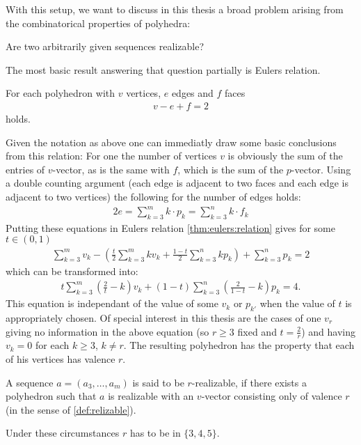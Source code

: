 With this setup, we want to discuss in this thesis a broad problem arising from the combinatorical properties of polyhedra:
\begin{problem} Are two arbitrarily given sequences realizable?
\end{problem}
The most basic result answering that question partially is Eulers relation.
\begin{theorem}\label{thm:eulers:relation}
  For each polyhedron with $v$ vertices, $e$ edges and $f$ faces
  \begin{align*}
    v - e + f = 2
  \end{align*}
  holds.
\end{theorem}
Given the notation as above one can immediatly draw some basic conclusions from this relation: For one the number of vertices $v$ is obviously the sum of the entries of $v$-vector, as is the same with $f$, which is the sum of the $p$-vector. Using a double counting argument (each edge is adjacent to two faces and each edge is adjacent to two vertices) the following for the number of edges holds:
\begin{align*}
  2e = \sum_{k=3}^{m} k \cdot p_k = \sum_{k=3}^{n} k \cdot f_k
\end{align*}
Putting these equations in Eulers relation \autoref{thm:eulers:relation} gives for some $t \in (0, 1)$
\begin{align*}
  \sum_{k=3}^m v_k - \left(\frac{t}{2} \sum_{k=3}^m k v_k + \frac{1-t}{2} \sum_{k=3}^n k p_k \right) + \sum_{k=3}^n p_k = 2
\end{align*}
which can be transformed into:
\begin{align*}
  t \sum_{k=3}^m \left(\frac{2}{t} - k \right) v_k + (1-t) \sum_{k=3}^n \left( \frac{2}{1-t} - k \right) p_k = 4.
\end{align*}
This equation is independant of the value of some $v_k$ or $p_{k'}$ when the value of $t$ is appropriately chosen. Of special interest in this thesis are the cases of one $v_r$ giving no information in the above equation (so $r \geq 3$ fixed and $t = \frac{2}{r}$) and having $v_{k} = 0$ for each $k \geq 3$, $k \neq r$. The resulting polyhedron has the property that each of his vertices has valence $r$. 
\begin{definition}[$r$-realizable]
  A sequence $a = (a_3, \dots, a_m)$ is said to be $r$-realizable, if there exists a polyhedron such that $a$ is realizable with an $v$-vector consisting only of valence $r$ (in the sense of \autoref{def:relizable}).
\end{definition}
Under these circumstances $r$ has to be in $\{3, 4, 5\}$.

